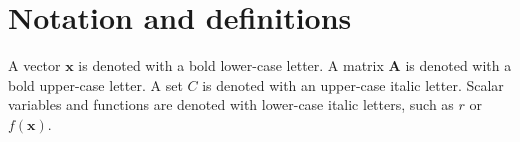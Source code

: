 


\section{Notation and definitions} \label{notations}

A vector  $\mathbf{x}$ is denoted with a bold lower-case letter.
A matrix $\mathbf{A}$ is denoted with a bold upper-case letter.
A set $C$ is denoted with an upper-case italic letter.
Scalar variables and functions are denoted with lower-case italic letters, such as
$r$ or $f(\textbf{x})$.




